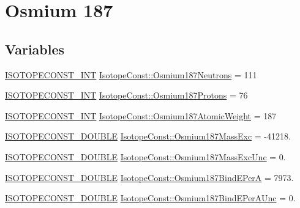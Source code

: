 \hypertarget{group___isotope_const-_osmium-_os187}{}\section{Osmium 187}
\label{group___isotope_const-_osmium-_os187}
\subsection*{Variables}
\begin{DoxyCompactItemize}
\item 
\mbox{\hyperlink{group___isotope_const-_macros_ga5f18360b3e99483a35c32d789e62621c}{I\+S\+O\+T\+O\+P\+E\+C\+O\+N\+S\+T\+\_\+\+I\+NT}} \mbox{\hyperlink{group___isotope_const-_osmium-_os187_ga4c9eba8ad8cb292960c0f1d09232c9cd}{Isotope\+Const\+::\+Osmium187\+Neutrons}} = 111
\item 
\mbox{\hyperlink{group___isotope_const-_macros_ga5f18360b3e99483a35c32d789e62621c}{I\+S\+O\+T\+O\+P\+E\+C\+O\+N\+S\+T\+\_\+\+I\+NT}} \mbox{\hyperlink{group___isotope_const-_osmium-_os187_ga90c00048ae428fd9b48ce6acc0b8a5c6}{Isotope\+Const\+::\+Osmium187\+Protons}} = 76
\item 
\mbox{\hyperlink{group___isotope_const-_macros_ga5f18360b3e99483a35c32d789e62621c}{I\+S\+O\+T\+O\+P\+E\+C\+O\+N\+S\+T\+\_\+\+I\+NT}} \mbox{\hyperlink{group___isotope_const-_osmium-_os187_ga48ef65d9ed8594629f8ee2173a8dc796}{Isotope\+Const\+::\+Osmium187\+Atomic\+Weight}} = 187
\item 
\mbox{\hyperlink{group___isotope_const-_macros_ga8f45a7272ce02c0b4c65c44636ed719a}{I\+S\+O\+T\+O\+P\+E\+C\+O\+N\+S\+T\+\_\+\+D\+O\+U\+B\+LE}} \mbox{\hyperlink{group___isotope_const-_osmium-_os187_ga60f4f00949d43e4b2bffa79c6a870f7e}{Isotope\+Const\+::\+Osmium187\+Mass\+Exc}} = -\/41218.
\item 
\mbox{\hyperlink{group___isotope_const-_macros_ga8f45a7272ce02c0b4c65c44636ed719a}{I\+S\+O\+T\+O\+P\+E\+C\+O\+N\+S\+T\+\_\+\+D\+O\+U\+B\+LE}} \mbox{\hyperlink{group___isotope_const-_osmium-_os187_ga1782c6cd16d9aba850f29fe096b84980}{Isotope\+Const\+::\+Osmium187\+Mass\+Exc\+Unc}} = 0.
\item 
\mbox{\hyperlink{group___isotope_const-_macros_ga8f45a7272ce02c0b4c65c44636ed719a}{I\+S\+O\+T\+O\+P\+E\+C\+O\+N\+S\+T\+\_\+\+D\+O\+U\+B\+LE}} \mbox{\hyperlink{group___isotope_const-_osmium-_os187_ga671d2551b843a53bbc3f4e648b5ca1fe}{Isotope\+Const\+::\+Osmium187\+Bind\+E\+PerA}} = 7973.
\item 
\mbox{\hyperlink{group___isotope_const-_macros_ga8f45a7272ce02c0b4c65c44636ed719a}{I\+S\+O\+T\+O\+P\+E\+C\+O\+N\+S\+T\+\_\+\+D\+O\+U\+B\+LE}} \mbox{\hyperlink{group___isotope_const-_osmium-_os187_ga8413ae57e85da5b32da4659d0a3f8947}{Isotope\+Const\+::\+Osmium187\+Bind\+E\+Per\+A\+Unc}} = 0.

\end{DoxyCompactItemize}
